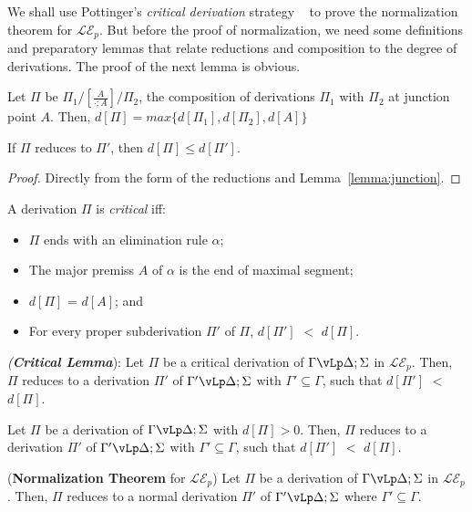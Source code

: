 
We shall use Pottinger's \textit{critical derivation} strategy ~\cite{Pottinger76} to prove the normalization theorem for $\mathcal{LE}_{p}$. But before the proof of normalization, we need some definitions and preparatory lemmas that relate reductions and composition to the degree of derivations. The proof of the next lemma is obvious.

\begin{lemma}\label{lemma:junction}
Let $\Pi$ be $\Pi_{1} /[\frac{A}{\cdot ;A}]/\Pi_{2}$, the composition of derivations $\Pi_{1}$ with $\Pi_ {2}$ at junction point $A$. Then, $d[\Pi ] = max\{d[\Pi_{1} ] , d[\Pi_{2} ], d[A]\}$
\end{lemma}

\begin {lemma} \label{lemma:reduction}
If $\Pi$ reduces to $\Pi'$, then $d[\Pi ] \leq d[\Pi']$.
\end{lemma}
\begin{proof}
Directly from the form of the reductions and Lemma~\ref{lemma:junction}.
\end{proof}
\begin{definition}
A derivation $\Pi$ is {\em critical} iff:
\begin{itemize}
\item $\Pi$ ends with an elimination rule $\alpha$;
\item The major premiss $A$ of $\alpha$ is the end of maximal segment;
\item $d[\Pi ]$ = $d[A]$; and
\item For every proper subderivation $\Pi'$ of $\Pi$, $d[\Pi' ]$ $<$ $d[\Pi ]$.
\end{itemize}
\end{definition}

\begin{lemma}\label{lemma:critical}
\textit{(\textbf{Critical Lemma}}): Let $\Pi$ be a critical derivation of $\Gamma\vLp \Delta ; \Sigma$  in $\mathcal{LE}_{p}$. Then, $\Pi$ reduces to a derivation $\Pi'$ of $\Gamma'\vLp\Delta ; \Sigma$ with $\Gamma ' \subseteq \Gamma$, such that $d[\Pi' ]$ $<$ $d[\Pi ]$.
\end{lemma}

\begin{lemma}\label{lemma:main}
Let $\Pi$ be a derivation of $\Gamma\vLp \Delta ; \Sigma$ with $d[\Pi]>0$.
Then, $\Pi$ reduces to a derivation $\Pi'$ of $\Gamma'\vLp \Delta ; \Sigma$ with $\Gamma ' \subseteq \Gamma$, such that $d[\Pi' ]$ $<$ $d[\Pi ]$. 
\end{lemma}


\begin{theorem} (\textbf{Normalization Theorem} for $\mathcal{LE}_{p}$)
Let $\Pi$ be a derivation of $\Gamma\vLp \Delta ; \Sigma$ in $\mathcal{LE}_p$. Then, $\Pi$ reduces to a normal derivation $\Pi'$ of $\Gamma'\vLp \Delta ; \Sigma$ where $\Gamma ' \subseteq \Gamma$.
\end{theorem}
